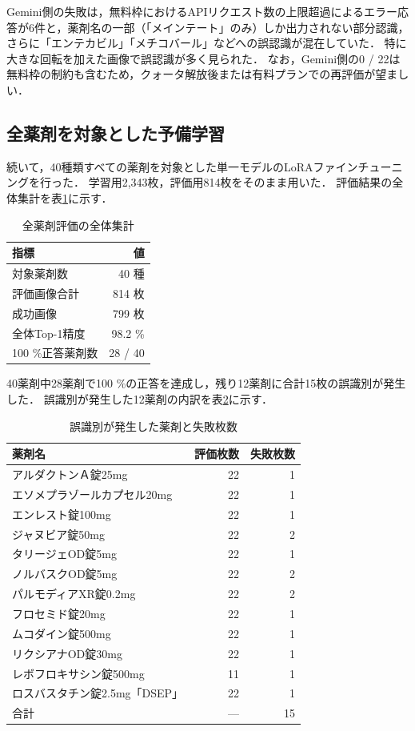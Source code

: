 \documentclass{ltjsarticle}
\begin{document}
Gemini側の失敗は，無料枠におけるAPIリクエスト数の上限超過によるエラー応答が6件と，薬剤名の一部（「メインテート」のみ）しか出力されない部分認識，さらに「エンテカビル」「メチコバール」などへの誤認識が混在していた．
特に大きな回転を加えた画像で誤認識が多く見られた．
なお，Gemini側の0 / 22は無料枠の制約も含むため，クォータ解放後または有料プランでの再評価が望ましい．

\subsection{全薬剤を対象とした予備学習}

続いて，40種類すべての薬剤を対象とした単一モデルのLoRAファインチューニングを行った．
学習用2,343枚，評価用814枚をそのまま用いた．
評価結果の全体集計を表\ref{tab:all_drugs_summary}に示す．

\begin{table}[h]
\centering
\caption{全薬剤評価の全体集計}
\label{tab:all_drugs_summary}
\begin{tabular}{lr}
\hline
指標 & 値 \\
\hline
対象薬剤数 & 40 種 \\
評価画像合計 & 814 枚 \\
成功画像 & 799 枚 \\
全体Top-1精度 & 98.2 \% \\
100 \%正答薬剤数 & 28 / 40 \\
\hline
\end{tabular}
\end{table}

40薬剤中28薬剤で100 \%の正答を達成し，残り12薬剤に合計15枚の誤識別が発生した．
誤識別が発生した12薬剤の内訳を表\ref{tab:failed_drugs}に示す．

\begin{table}[h]
\centering
\caption{誤識別が発生した薬剤と失敗枚数}
\label{tab:failed_drugs}
\small
\begin{tabular}{lrr}
\hline
薬剤名 & 評価枚数 & 失敗枚数 \\
\hline
アルダクトンＡ錠25mg & 22 & 1 \\
エソメプラゾールカプセル20mg & 22 & 1 \\
エンレスト錠100mg & 22 & 1 \\
ジャヌビア錠50mg & 22 & 2 \\
タリージェOD錠5mg & 22 & 1 \\
ノルバスクOD錠5mg & 22 & 2 \\
パルモディアXR錠0.2mg & 22 & 2 \\
フロセミド錠20mg & 22 & 1 \\
ムコダイン錠500mg & 22 & 1 \\
リクシアナOD錠30mg & 22 & 1 \\
レボフロキサシン錠500mg & 11 & 1 \\
ロスバスタチン錠2.5mg「DSEP」 & 22 & 1 \\
\hline
合計 & --- & 15 \\
\hline
\end{tabular}
\end{table}
\end{document}
